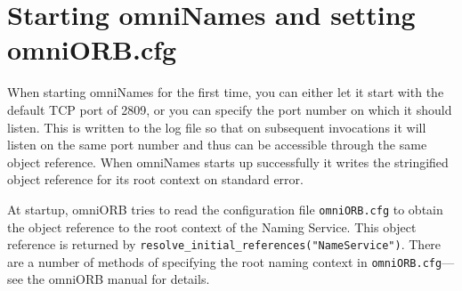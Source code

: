 \documentclass[a4paper,11pt,twoside]{article}
\begin{document}
\section{Starting omniNames and setting omniORB.cfg}

When starting omniNames for the first time, you can either let it
start with the default TCP port of 2809, or you can specify the port
number on which it should listen.  This is written to the log file so
that on subsequent invocations it will listen on the same port number
and thus can be accessible through the same object reference.  When
omniNames starts up successfully it writes the stringified object
reference for its root context on standard error.

At startup, omniORB tries to read the configuration file
\verb|omniORB.cfg| to obtain the object reference to the root context
of the Naming Service.  This object reference is returned by
\verb|resolve_initial_references("NameService")|. There are a number
of methods of specifying the root naming context in
\verb|omniORB.cfg|---see the omniORB manual for details.
\end{document}
